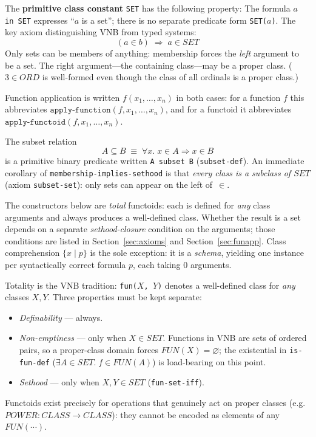 The \textbf{primitive class constant} \texttt{SET} has the following
property: The formula \texttt{$a$ in SET} expresses ``$a$ is a set'';
there is no separate predicate form \texttt{SET($a$)}.  The key axiom
distinguishing VNB from typed systems: \[
  (a \in b) \;\Longrightarrow\; a \in \mathit{SET}
\]
Only sets can be members of anything: membership forces the \emph{left}
argument to be a set.  The right argument---the containing class---may be
a proper class.  ($3 \in \mathit{ORD}$ is well-formed even though the
class of all ordinals is a proper class.)

Function application is written $f(x_1, \ldots, x_n)$ in both cases:
for a function $f$ this abbreviates $\texttt{apply-function}(f, x_1, \ldots, x_n)$,
and for a functoid it abbreviates $\texttt{apply-functoid}(f, x_1, \ldots, x_n)$.

The subset relation
\[
  A \subseteq B \;\equiv\; \forall x.\; x \in A \Rightarrow x \in B
\]
is a primitive binary predicate written \texttt{A subset B}
(\texttt{subset-def}).  An immediate corollary of
\texttt{membership-implies-sethood} is that \emph{every class is a
subclass of $\mathit{SET}$} (axiom \texttt{subset-set}): only sets can
appear on the left of~$\in$.

The constructors below are \emph{total} functoids: each is defined for
\emph{any} class arguments and always produces a well-defined class.
Whether the result is a set depends on a separate \emph{sethood-closure}
condition on the arguments; those conditions are listed in
Section~\ref{sec:axioms} and Section~\ref{sec:funapp}.
Class comprehension $\{x \mid p\}$ is the sole exception: it is a
\emph{schema}, yielding one instance per syntactically correct formula
$p$, each taking $0$ arguments.

\begin{remark}
Totality is the VNB tradition: \texttt{fun($X$, $Y$)} denotes a
well-defined class for \emph{any} classes $X, Y$.  Three properties
must be kept separate:
\begin{itemize}
\item \emph{Definability} --- always.
\item \emph{Non-emptiness} --- only when $X \in \mathit{SET}$.
  Functions in VNB are sets of ordered pairs, so a proper-class
  domain forces $\mathit{FUN}(X) = \varnothing$; the existential in
  \texttt{is-fun-def} ($\exists A \in \mathit{SET}.\; f \in
  \mathit{FUN}(A)$) is load-bearing on this point.
\item \emph{Sethood} --- only when $X, Y \in \mathit{SET}$
  (\texttt{fun-set-iff}).
\end{itemize}
Functoids exist precisely for operations that genuinely act on
proper classes (e.g.\ $\mathit{POWER}: \mathit{CLASS} \to
\mathit{CLASS}$): they cannot be encoded as elements of any
$\mathit{FUN}(\cdots)$.
\end{remark}

